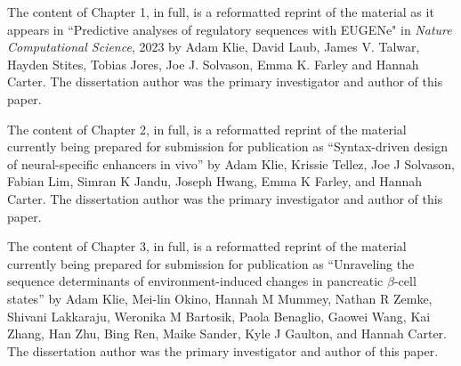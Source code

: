 \documentclass[11pt]{formatting-template}
\begin{document}

\tableofcontents
\listoffigures
\listoftables

\begin{acknowledgements}

	The content of Chapter 1, in full, is a reformatted reprint of the material as it appears in “Predictive analyses of regulatory sequences with EUGENe" in \textit{Nature Computational Science}, 2023 by Adam Klie, David Laub, James V. Talwar, Hayden Stites, Tobias Jores, Joe J. Solvason, Emma K. Farley and Hannah Carter. The dissertation author was the primary investigator and author of this paper.

	The content of Chapter 2, in full, is a reformatted reprint of the material currently being prepared for submission for publication as “Syntax-driven design of neural-specific enhancers in vivo'' by Adam Klie, Krissie Tellez, Joe J Solvason, Fabian Lim, Simran K Jandu, Joseph Hwang, Emma K Farley, and Hannah Carter. The dissertation author was the primary investigator and author of this paper.

	The content of Chapter 3, in full, is a reformatted reprint of the material currently being prepared for submission for publication as “Unraveling the sequence determinants of environment-induced changes in pancreatic $\beta$-cell states'' by Adam Klie, Mei-lin Okino, Hannah M Mummey, Nathan R Zemke, Shivani Lakkaraju, Weronika M Bartosik, Paola Benaglio, Gaowei Wang, Kai Zhang, Han Zhu, Bing Ren, Maike Sander, Kyle J Gaulton, and Hannah Carter. The dissertation author was the primary investigator and author of this paper.

\end{acknowledgements}
\end{document}
